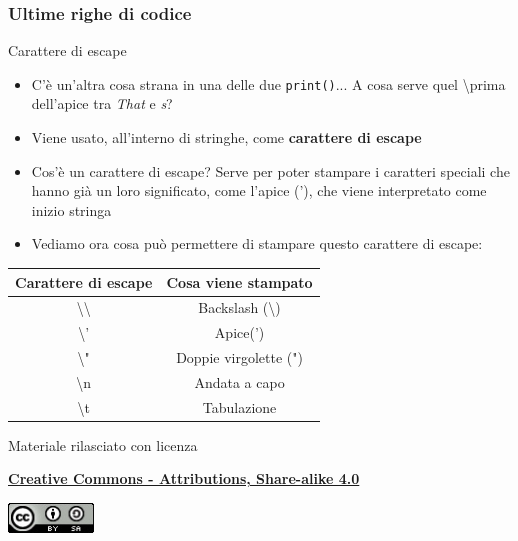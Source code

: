 \documentclass{beamer}
\begin{document}
\begin{frame}[fragile]
\frametitle{Ultime righe di codice}
	\begin{block}{Carattere di escape}
	\begin{itemize}
		\item C'è un'altra cosa strana in una delle due \texttt{print()}... A cosa serve quel \textbackslash prima dell'apice tra \textit{That} e \textit{s}?
		\item Viene usato, all'interno di stringhe, come \textbf{carattere di escape}
		\item Cos'è un carattere di escape? Serve per poter stampare i caratteri speciali che hanno già un loro significato, come l'apice ('), che viene interpretato come inizio stringa
		\item Vediamo ora cosa può permettere di stampare questo carattere di escape:
	\end{itemize}
\end{block}
\begin{center}
\begin{tabular}{ c  c }
	\hline
	Carattere di escape & Cosa viene stampato \\ 
	\hline
	\textbackslash \textbackslash & Backslash (\textbackslash)  \\
	\textbackslash ' & Apice(') \\
	\textbackslash " & Doppie virgolette (")\\  
	\textbackslash n & Andata a capo\\
	\textbackslash t & Tabulazione 
\end{tabular}
\end{center}
\end{frame}


\begin{frame}

\begin{center}
	\bigskip
	Materiale rilasciato con licenza
	
	\textbf{\href{http://creativecommons.org/licenses/by-sa/4.0/}{Creative Commons - Attributions, Share-alike 4.0}}
	
	\medskip
	\includegraphics[height=0.8cm]{images/cc.jpeg}
\end{center}

\end{frame}	
\end{document}
